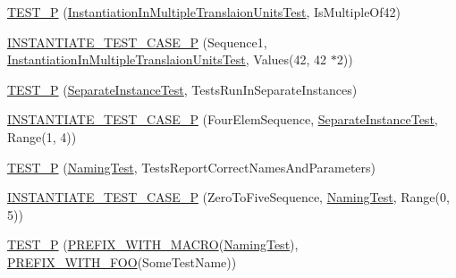\begin{DoxyCompactItemize}
\item 
\mbox{\hyperlink{_obj__test_2lib_2googletest-release-1_88_81_2googletest_2test_2googletest-param-test-test_8cc_aca1b0c41396a0db4f07796948da7d27a}{T\+E\+S\+T\+\_\+P}} (\mbox{\hyperlink{class_instantiation_in_multiple_translaion_units_test}{Instantiation\+In\+Multiple\+Translaion\+Units\+Test}}, Is\+Multiple\+Of42)
\item 
\mbox{\hyperlink{_obj__test_2lib_2googletest-release-1_88_81_2googletest_2test_2googletest-param-test-test_8cc_a41c810122d57220f09f1e3d33b5a58a7}{I\+N\+S\+T\+A\+N\+T\+I\+A\+T\+E\+\_\+\+T\+E\+S\+T\+\_\+\+C\+A\+S\+E\+\_\+P}} (Sequence1, \mbox{\hyperlink{class_instantiation_in_multiple_translaion_units_test}{Instantiation\+In\+Multiple\+Translaion\+Units\+Test}}, Values(42, 42 $\ast$2))
\item 
\mbox{\hyperlink{_obj__test_2lib_2googletest-release-1_88_81_2googletest_2test_2googletest-param-test-test_8cc_ae517694af7a7a007acd12e9a7247afe9}{T\+E\+S\+T\+\_\+P}} (\mbox{\hyperlink{class_separate_instance_test}{Separate\+Instance\+Test}}, Tests\+Run\+In\+Separate\+Instances)
\item 
\mbox{\hyperlink{_obj__test_2lib_2googletest-release-1_88_81_2googletest_2test_2googletest-param-test-test_8cc_ac531206c956ac20121a4a6128e5d0912}{I\+N\+S\+T\+A\+N\+T\+I\+A\+T\+E\+\_\+\+T\+E\+S\+T\+\_\+\+C\+A\+S\+E\+\_\+P}} (Four\+Elem\+Sequence, \mbox{\hyperlink{class_separate_instance_test}{Separate\+Instance\+Test}}, Range(1, 4))
\item 
\mbox{\hyperlink{_obj__test_2lib_2googletest-release-1_88_81_2googletest_2test_2googletest-param-test-test_8cc_a1f8ae152b21130f3ca99bdeab97e872a}{T\+E\+S\+T\+\_\+P}} (\mbox{\hyperlink{class_naming_test}{Naming\+Test}}, Tests\+Report\+Correct\+Names\+And\+Parameters)
\item 
\mbox{\hyperlink{_obj__test_2lib_2googletest-release-1_88_81_2googletest_2test_2googletest-param-test-test_8cc_aa9659bbfc12103a583c0a221118b28ce}{I\+N\+S\+T\+A\+N\+T\+I\+A\+T\+E\+\_\+\+T\+E\+S\+T\+\_\+\+C\+A\+S\+E\+\_\+P}} (Zero\+To\+Five\+Sequence, \mbox{\hyperlink{class_naming_test}{Naming\+Test}}, Range(0, 5))
\item 
\mbox{\hyperlink{_obj__test_2lib_2googletest-release-1_88_81_2googletest_2test_2googletest-param-test-test_8cc_a268b3f484920a6a3c08d911a47f07509}{T\+E\+S\+T\+\_\+P}} (\mbox{\hyperlink{_obj__test_2lib_2googletest-release-1_88_81_2googletest_2test_2googletest-param-test-test_8cc_aeb9b224f65fb5b0b8f2323a6903d6a68}{P\+R\+E\+F\+I\+X\+\_\+\+W\+I\+T\+H\+\_\+\+M\+A\+C\+RO}}(\mbox{\hyperlink{class_naming_test}{Naming\+Test}}), \mbox{\hyperlink{_obj__test_2lib_2googletest-release-1_88_81_2googletest_2test_2googletest-param-test-test_8cc_a6414de581a925e7399b27c14e38f8a67}{P\+R\+E\+F\+I\+X\+\_\+\+W\+I\+T\+H\+\_\+\+F\+OO}}(Some\+Test\+Name))

\end{DoxyCompactItemize}
